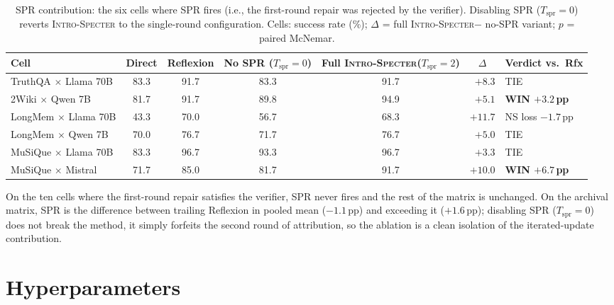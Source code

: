 \documentclass{article}
\newcommand{\method}{\textsc{Intro-Specter}\xspace}
\begin{document}
\begin{table}[h]\centering\small
\caption{SPR contribution: the six cells where SPR fires (i.e., the first-round repair was rejected by the verifier). Disabling SPR ($T_{\text{spr}}=0$) reverts \method to the single-round configuration. Cells: success rate (\%); $\Delta$ = full \method $-$ no-SPR variant; $p$ = paired McNemar.}
\label{tab:spr-impact}\setlength{\tabcolsep}{4pt}
\begin{tabular}{lccccr l}\toprule
Cell & Direct & Reflexion & No SPR ($T_{\text{spr}}=0$) & Full \method ($T_{\text{spr}}=2$) & \multicolumn{1}{c}{$\Delta$} & Verdict vs.\ Rfx \\\midrule
TruthQA $\times$ Llama 70B & 83.3 & 91.7 & 83.3 & 91.7 & $+8.3$ & TIE \\
2Wiki $\times$ Qwen 7B     & 81.7 & 91.7 & 89.8 & 94.9 & $+5.1$ & \textbf{WIN $+3.2$\,pp} \\
LongMem $\times$ Llama 70B & 43.3 & 70.0 & 56.7 & 68.3 & $+11.7$ & NS loss $-1.7$\,pp \\
LongMem $\times$ Qwen 7B   & 70.0 & 76.7 & 71.7 & 76.7 & $+5.0$ & TIE \\
MuSiQue $\times$ Llama 70B & 83.3 & 96.7 & 93.3 & 96.7 & $+3.3$ & TIE \\
MuSiQue $\times$ Mistral   & 71.7 & 85.0 & 81.7 & 91.7 & $+10.0$ & \textbf{WIN $+6.7$\,pp} \\
\bottomrule\end{tabular}\end{table}

On the ten cells where the first-round repair satisfies the verifier, SPR never fires and the rest of the matrix is unchanged. On the archival matrix, SPR is the difference between trailing Reflexion in pooled mean ($-1.1$\,pp) and exceeding it ($+1.6$\,pp); disabling SPR ($T_{\text{spr}}=0$) does not break the method, it simply forfeits the second round of attribution, so the ablation is a clean isolation of the iterated-update contribution.

\section{Hyperparameters}\label{app:hparams}
\end{document}
